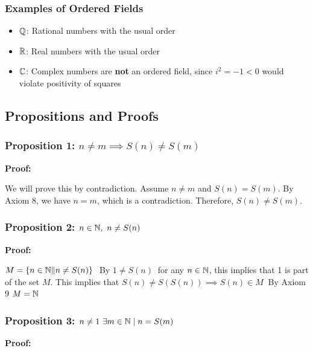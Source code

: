 \subsubsection{Examples of Ordered Fields}

\begin{itemize}
    \item \( \mathbb{Q} \): Rational numbers with the usual order
    \item \( \mathbb{R} \): Real numbers with the usual order
    \item \( \mathbb{C} \): Complex numbers are \textbf{not} an ordered field, since \( i^2 = -1 < 0 \) would violate positivity of squares
\end{itemize}

\subsection{Propositions and Proofs}

\subsubsection{Proposition 1: \texorpdfstring{\(n \ne m \implies S(n) \ne S(m)\)}{n!= m implies S (n)!=S (m)}}

\textbf{Proof:} 

We will prove this by contradiction. Assume \( n \ne m \) and \( S(n) = S(m) \). By Axiom 8, we have \( n = m \), 
which is a contradiction. Therefore, \( S(n) \ne S(m) \).

\subsubsection{Proposition 2: \texorpdfstring{ \(n \in \mathbb{N},\ n \ne S(n)\)}{ For any n in N, n!= S (n)}}

\textbf{Proof:} 

\(M = \{n \in \Naturals \| n \ne S(n) \}\ \)
By \(1 \ne S(n)\ \) for any \(n \in \mathbb{N}\), this implies that 1 is part of the set \(M\). This implies that \(S(n) \ne S(S(n)) \implies S(n) \in M\ \) By Axiom 9 \(M = \mathbb{N}\)

\subsubsection{Proposition 3: \texorpdfstring{\(n \ne 1\ \exists m \in \mathbb{N} \mid n = S(m)\)}{n!= 1, exists m in N | n = S (m)}}

\textbf{Proof:}


